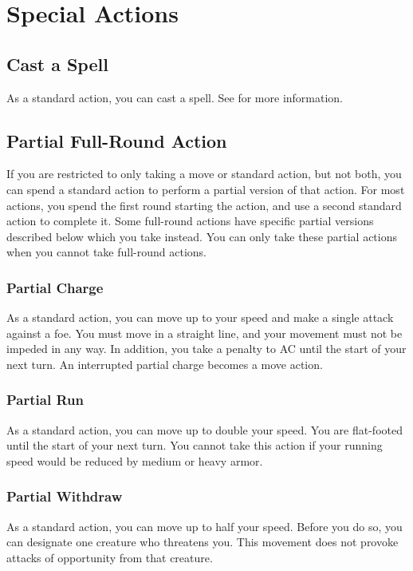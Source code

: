\section{Special Actions}

\subsection{Cast a Spell}
As a standard action, you can cast a spell. See  for more information. 

\subsection{Partial Full-Round Action}
If you are restricted to only taking a move or standard action, but not both, you can spend a standard action to perform a partial version of that action. For most actions, you spend the first round starting the action, and use a second standard action to complete it. Some full-round actions have specific partial versions described below which you take instead. You can only take these partial actions when you cannot take full-round actions. 

\subsubsection{Partial Charge}
As a standard action, you can move up to your speed and make a single attack against a foe. You must move in a straight line, and your movement must not be impeded in any way. In addition, you take a  penalty to AC until the start of your next turn. An interrupted partial charge becomes a move action.

\subsubsection{Partial Run}
As a standard action, you can move up to double your speed. You are flat-footed until the start of your next turn. You cannot take this action if your running speed would be reduced by medium or heavy armor. 

\subsubsection{Partial Withdraw}
As a standard action, you can move up to half your speed. Before you do so, you can designate one creature who threatens you. This movement does not provoke attacks of opportunity from that creature.

